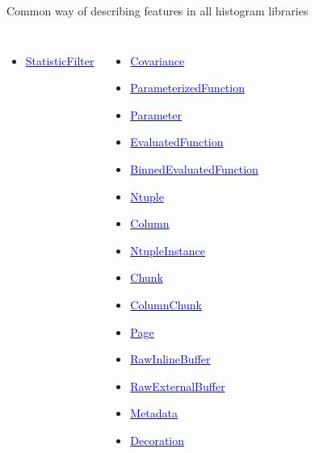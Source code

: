 \documentclass[aspectratio=169]{beamer}
\begin{document}
\begin{frame}{Common way of describing features in all histogram libraries}
\begin{columns}[t]
\begin{itemize}
  \item \href{https://github.com/scikit-hep/aghast/blob/master/specification.adoc\#statisticfilter}{\textcolor{blue}{StatisticFilter}}
\end{itemize}
\begin{itemize}
  \item \href{https://github.com/scikit-hep/aghast/blob/master/specification.adoc\#covariance}{\textcolor{blue}{Covariance}}
  \item \href{https://github.com/scikit-hep/aghast/blob/master/specification.adoc\#parameterizedfunction}{\textcolor{blue}{ParameterizedFunction}}
  \item \href{https://github.com/scikit-hep/aghast/blob/master/specification.adoc\#parameter}{\textcolor{blue}{Parameter}}
  \item \href{https://github.com/scikit-hep/aghast/blob/master/specification.adoc\#evaluatedfunction}{\textcolor{blue}{EvaluatedFunction}}
  \item \href{https://github.com/scikit-hep/aghast/blob/master/specification.adoc\#binnedevaluatedfunction}{\textcolor{blue}{BinnedEvaluatedFunction}}
  \item \href{https://github.com/scikit-hep/aghast/blob/master/specification.adoc\#ntuple}{\textcolor{blue}{Ntuple}}
  \item \href{https://github.com/scikit-hep/aghast/blob/master/specification.adoc\#column}{\textcolor{blue}{Column}}
  \item \href{https://github.com/scikit-hep/aghast/blob/master/specification.adoc\#ntupleinstance}{\textcolor{blue}{NtupleInstance}}
  \item \href{https://github.com/scikit-hep/aghast/blob/master/specification.adoc\#chunk}{\textcolor{blue}{Chunk}}
  \item \href{https://github.com/scikit-hep/aghast/blob/master/specification.adoc\#columnchunk}{\textcolor{blue}{ColumnChunk}}
  \item \href{https://github.com/scikit-hep/aghast/blob/master/specification.adoc\#page}{\textcolor{blue}{Page}}
  \item \href{https://github.com/scikit-hep/aghast/blob/master/specification.adoc\#rawinlinebuffer}{\textcolor{blue}{RawInlineBuffer}}
  \item \href{https://github.com/scikit-hep/aghast/blob/master/specification.adoc\#rawexternalbuffer}{\textcolor{blue}{RawExternalBuffer}}
  \item \href{https://github.com/scikit-hep/aghast/blob/master/specification.adoc\#metadata}{\textcolor{blue}{Metadata}}
  \item \href{https://github.com/scikit-hep/aghast/blob/master/specification.adoc\#decoration}{\textcolor{blue}{Decoration}}
\end{itemize}
\end{columns}
\end{frame}
\end{document}
